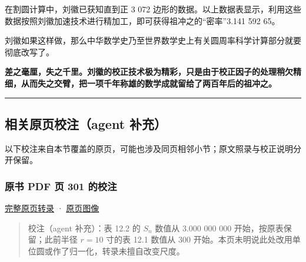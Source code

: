 \documentclass[
  10pt,
  fontset=fandol]{ctexart}
\begin{document}
在割圆计算中，刘徽已获知直到正 3 072 边形的数据。以上数据表显示，利用这些数据按照刘徽加速技术进行精加工，即可获得祖冲之的``密率''3.141 592 65。

刘徽如果这样做，那么中华数学史乃至世界数学史上有关圆周率科学计算部分就要彻底改写了。

\textbf{差之毫厘，失之千里。刘徽的校正技术极为精彩，只是由于校正因子的处理稍欠精细，从而失之交臂，把一项千年称雄的数学成就留给了两百年后的祖冲之。}

\begin{center}\rule{0.5\linewidth}{0.5pt}\end{center}

\subsection{相关原页校注（agent 补充）}\label{ux76f8ux5173ux539fux9875ux6821ux6ce8agent-ux8865ux5145}

以下校注来自本节覆盖的原页，可能也涉及同页相邻小节；原文照录与校正说明分开保留。

\subsubsection{原书 PDF 页 301 的校注}\label{ux539fux4e66-pdf-ux9875-301-ux7684ux6821ux6ce8}

\href{../pages/pdf-301.md}{完整原页转录} · \href{../../source-images/pdf-301.jpeg}{原页图像}

\begin{quote}
校注（agent 补充）：表 12.2 的 \(S_n\) 数值从 3.000 000 000 开始，按原表保留；此前半径 \(r=10\) 寸的表 12.1 数值从 300 开始。本页未明说此处改用单位圆或作了归一化，转录未擅自改变尺度。
\end{quote}
\end{document}

